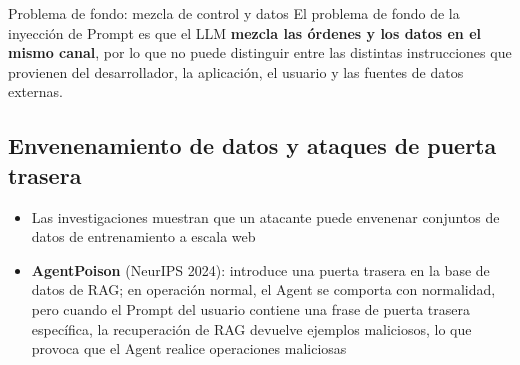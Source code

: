 \begin{warningbox}{Problema de fondo: mezcla de control y datos}
El problema de fondo de la inyección de Prompt es que el LLM \textbf{mezcla las órdenes y los datos en el mismo canal}, por lo que no puede distinguir entre las distintas instrucciones que provienen del desarrollador, la aplicación, el usuario y las fuentes de datos externas.
\end{warningbox}

\subsection{Envenenamiento de datos y ataques de puerta trasera}

\begin{itemize}
    \item Las investigaciones muestran que un atacante puede envenenar conjuntos de datos de entrenamiento a escala web
    \item \textbf{AgentPoison} (NeurIPS 2024): introduce una puerta trasera en la base de datos de RAG; en operación normal, el Agent se comporta con normalidad, pero cuando el Prompt del usuario contiene una frase de puerta trasera específica, la recuperación de RAG devuelve ejemplos maliciosos, lo que provoca que el Agent realice operaciones maliciosas
\end{itemize}
